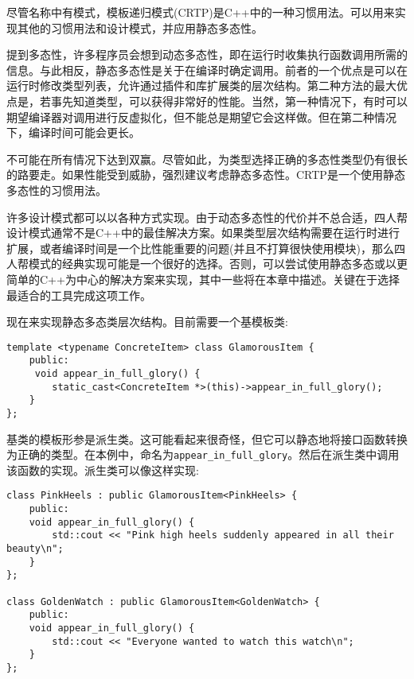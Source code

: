 
尽管名称中有模式，模板递归模式(CRTP)是C++中的一种习惯用法。可以用来实现其他的习惯用法和设计模式，并应用静态多态性。


提到多态性，许多程序员会想到动态多态性，即在运行时收集执行函数调用所需的信息。与此相反，静态多态性是关于在编译时确定调用。前者的一个优点是可以在运行时修改类型列表，允许通过插件和库扩展类的层次结构。第二种方法的最大优点是，若事先知道类型，可以获得非常好的性能。当然，第一种情况下，有时可以期望编译器对调用进行反虚拟化，但不能总是期望它会这样做。但在第二种情况下，编译时间可能会更长。

不可能在所有情况下达到双赢。尽管如此，为类型选择正确的多态性类型仍有很长的路要走。如果性能受到威胁，强烈建议考虑静态多态性。CRTP是一个使用静态多态性的习惯用法。

许多设计模式都可以以各种方式实现。由于动态多态性的代价并不总合适，四人帮设计模式通常不是C++中的最佳解决方案。如果类型层次结构需要在运行时进行扩展，或者编译时间是一个比性能重要的问题(并且不打算很快使用模块)，那么四人帮模式的经典实现可能是一个很好的选择。否则，可以尝试使用静态多态或以更简单的C++为中心的解决方案来实现，其中一些将在本章中描述。关键在于选择最适合的工具完成这项工作。


现在来实现静态多态类层次结构。目前需要一个基模板类:

\begin{lstlisting}[style=styleCXX]
template <typename ConcreteItem> class GlamorousItem {
	public:
	 void appear_in_full_glory() {
		static_cast<ConcreteItem *>(this)->appear_in_full_glory();
	}
};
\end{lstlisting}

基类的模板形参是派生类。这可能看起来很奇怪，但它可以静态地将接口函数转换为正确的类型。在本例中，命名为\texttt{appear\_in\_full\_glory}。然后在派生类中调用该函数的实现。派生类可以像这样实现:

\begin{lstlisting}[style=styleCXX]
class PinkHeels : public GlamorousItem<PinkHeels> {
	public:
	void appear_in_full_glory() {
		std::cout << "Pink high heels suddenly appeared in all their beauty\n";
	}
};

class GoldenWatch : public GlamorousItem<GoldenWatch> {
	public:
	void appear_in_full_glory() {
		std::cout << "Everyone wanted to watch this watch\n";
	}
};
\end{lstlisting}

